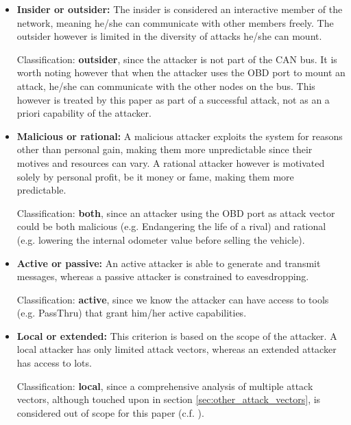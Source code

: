 \documentclass[11pt]{article}
\begin{document}
\begin{itemize}
	\item \textbf{Insider or outsider:} The insider is considered an interactive member of the network, meaning he/she can communicate with other members freely. The outsider however is limited in the diversity of attacks he/she can mount.
	
	Classification: \textbf{outsider}, since the attacker is not part of the CAN bus. It is worth noting however that when the attacker uses the OBD port to mount an attack, he/she can communicate with the other nodes on the bus. This however is treated by this paper as part of a successful attack, not as an a priori capability of the attacker.
	
	\item \textbf{Malicious or rational:}  A malicious attacker exploits the system for reasons other than personal gain, making them more unpredictable since their motives and resources can vary. A rational attacker however is motivated solely by personal profit, be it money or fame, making them more predictable.
	
	Classification: \textbf{both}, since an attacker using the OBD port as attack vector could be both malicious (e.g. Endangering the life of a rival) and rational (e.g. lowering the internal odometer value before selling the vehicle).
	
	\item \textbf{Active or passive:} An active attacker is able to generate and transmit messages, whereas a passive attacker is constrained to eavesdropping.
	
	Classification: \textbf{active}, since we know the attacker can have access to tools (e.g. PassThru) that grant him/her active capabilities.
	
	\item \textbf{Local or extended:} This criterion is based on the scope of the attacker. A local attacker has only limited attack vectors, whereas an extended attacker has access to lots.
	
	Classification: \textbf{local}, since a comprehensive analysis of multiple attack vectors, although touched upon in section \ref{sec:other_attack_vectors}, is considered out of scope for this paper (c.f. \cite{Pike15}\cite{Kleberger15}\cite{Russel17}\cite{MillerA}\cite{Petit}\cite{Kosher}\cite{Kosher2}\cite{Bayer15}).
\end{itemize}
\end{document}
